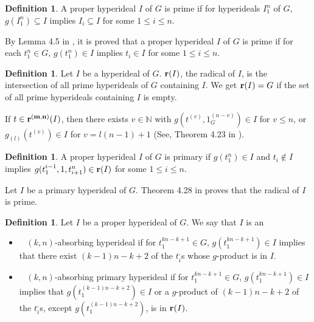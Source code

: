 \documentclass[preprint,review,10pt]{amsart}
\theoremstyle{definition}
\newtheorem{definition}[theorem]{Definition}
\theoremstyle{remark}
\numberwithin{equation}{section}
\begin{document}
\begin{definition}
 \cite{sorc1} A proper hyperideal $I$ of  $G$ is    prime  if for hyperideals $I_1^n$ of $G$, $g(I_1^ n) \subseteq I$ implies $I_i \subseteq I$ for some $1 \leq i \leq n$.
\end{definition}
 
By Lemma 4.5 in \cite{sorc1}, it is proved that  a proper hyperideal $I$ of $G$ is  prime  if for each $t^n_ 1 \in G$, $g(t^n_ 1) \in I$ implies  $t_i \in I$ for some $1 \leq i \leq n$. 

\begin{definition} \cite{sorc1}   Let $I$ be a hyperideal of $G$. ${\bf r}(I)$, the radical of $I$,  is the intersection of  all  prime hyperideals of $G$ containing $I$.  We get ${\bf r}(I)=G$ if the set of all prime hyperideals   containing $I$ is empty.
\end{definition}
 If $t \in {\bf r^{(m,n)}}(I)$, then 
 there exists $v \in \mathbb {N}$ with $g(t^ {(v)} , 1_G^{(n-v)} ) \in I$ for $v \leq n$, or $g_{(l)} (t^ {(v)} ) \in I$ for $v = l(n-1) + 1$ (See, Theorem 4.23 in \cite{sorc1}).
\begin{definition}
\cite{sorc1} A proper hyperideal  $I$ of $G$ is     primary  if $g(t^n _1) \in I$ and $t_i \notin I$ implies $g(t_1^{i-1}, 1,t _{ i+1}^n) \in {\bf r}(I)$ for some $1 \leq i \leq n$.
\end{definition}
Let $I$ be a primary hyperideal of $G$. Theorem 4.28 in \cite{sorc1} proves that the radical of  $I$ is prime.
 \begin{definition} 
\cite{rev2} Let $I$ be a proper hyperideal of  $G$. We say that $I$ is an 
\begin{itemize}
\item[\rm(1)]~ $(k,n)$-absorbing hyperideal  if for  $t_1^{kn-k+1} \in G$, $g(t_1^{kn-k+1}) \in I$ implies that there exist $(k-1)n-k+2$ of the $t_i^,$s whose $g$-product is in $I$. 
\item[\rm(2)]~ $(k,n)$-absorbing primary hyperideal  if for  $t_1^{kn-k+1} \in G$, $g(t_1^{kn-k+1}) \in I$ implies that $g(t_1^{(k-1)n-k+2}) \in I$ or a $g$-product of $(k-1)n-k+2$ of the $t_i^,$s, except $g(t_1^{(k-1)n-k+2})$, is in ${\bf r}(I)$.
\end{itemize}
\end{definition}

\end{document}
